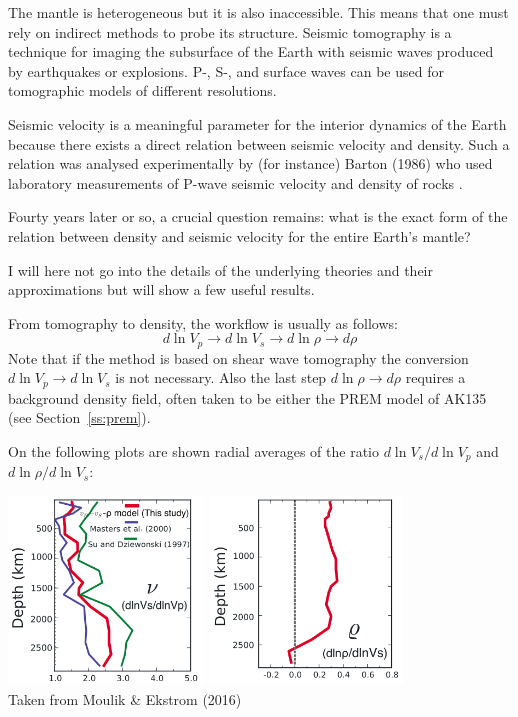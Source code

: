 
The mantle is heterogeneous but it is also inaccessible. This means that one must rely on indirect methods 
to probe its structure. Seismic tomography is a technique for imaging the subsurface of 
the Earth with seismic waves produced by earthquakes or explosions. 
P-, S-, and surface waves can be used for tomographic models of different resolutions.

Seismic velocity is a meaningful parameter for the interior dynamics of the
Earth because there exists a direct relation between seismic velocity and density. 
Such a relation was analysed experimentally by (for instance) Barton (1986) who 
used laboratory measurements of P-wave seismic velocity and density of rocks \cite{bart86}. 

Fourty years later or so, a crucial question remains: what is the exact form of the 
relation between density and seismic velocity for the entire Earth’s mantle?

I will here not go into the details of the underlying theories and their approximations but 
will show a few useful results. 

From tomography to density, the workflow is usually as follows:
\[
d \ln V_p \rightarrow d \ln V_s \rightarrow d \ln \rho \rightarrow d\rho
\]
Note that if the method is based on shear wave tomography the conversion $d \ln V_p \rightarrow d \ln V_s$
is not necessary. 
Also the last step $d \ln \rho \rightarrow d\rho$ requires a background density field, 
often taken to be either the PREM model of AK135 (see Section~\ref{ss:prem}). 

On the following plots are shown radial averages of the ratio $d \ln V_s/d\ln V_p$ and 
$d\ln \rho/d \ln V_s$:

\begin{center}
\includegraphics[height=5cm]{images/dlnvsdlnrho/moek16b}
\includegraphics[height=5cm]{images/dlnvsdlnrho/moek16a}\\
{\captionfont Taken from Moulik \& Ekstrom (2016) \cite{moek16}}
\end{center}

